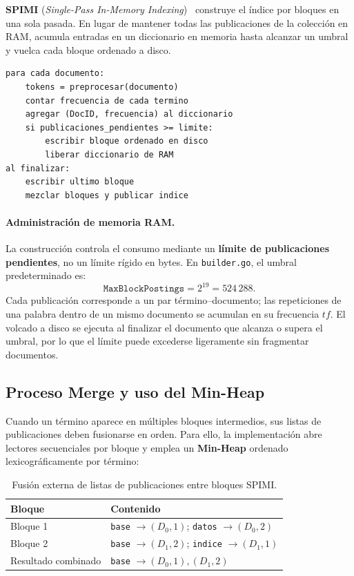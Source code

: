 \documentclass[11pt,a4paper]{article}
\begin{document}
\textbf{SPIMI} (\emph{Single-Pass In-Memory Indexing})~\cite{manning2008} construye el índice por bloques en una sola pasada. En lugar de mantener todas las publicaciones de la colección en RAM, acumula entradas en un diccionario en memoria hasta alcanzar un umbral y vuelca cada bloque ordenado a disco.

\begin{lstlisting}[style=pseudo,caption={Pseudocódigo simplificado de construcción con SPIMI}]
para cada documento:
    tokens = preprocesar(documento)
    contar frecuencia de cada termino
    agregar (DocID, frecuencia) al diccionario
    si publicaciones_pendientes >= limite:
        escribir bloque ordenado en disco
        liberar diccionario de RAM
al finalizar:
    escribir ultimo bloque
    mezclar bloques y publicar indice
\end{lstlisting}

\paragraph{Administración de memoria RAM.} La construcción controla el consumo mediante un \textbf{límite de publicaciones pendientes}, no un límite rígido en bytes. En \texttt{builder.go}, el umbral predeterminado es:
\[
\texttt{MaxBlockPostings} = 2^{19} = 524\,288.
\]
Cada publicación corresponde a un par término--documento; las repeticiones de una palabra dentro de un mismo documento se acumulan en su frecuencia $tf$. El volcado a disco se ejecuta al finalizar el documento que alcanza o supera el umbral, por lo que el límite puede excederse ligeramente sin fragmentar documentos.

\subsection{Proceso Merge y uso del Min-Heap}

Cuando un término aparece en múltiples bloques intermedios, sus listas de publicaciones deben fusionarse en orden. Para ello, la implementación abre lectores secuenciales por bloque y emplea un \textbf{Min-Heap} ordenado lexicográficamente por término:

\begin{table}[H]
  \centering
  \small
  \begin{tabular}{@{}ll@{}}
    \toprule
    \textbf{Bloque} & \textbf{Contenido} \\
    \midrule
    Bloque 1 & \texttt{base} $\to (D_0,1)$; \texttt{datos} $\to (D_0,2)$ \\
    Bloque 2 & \texttt{base} $\to (D_1,2)$; \texttt{indice} $\to (D_1,1)$ \\
    \midrule
    Resultado combinado & \texttt{base} $\to (D_0,1), (D_1,2)$ \\
    \bottomrule
  \end{tabular}
  \caption{Fusión externa de listas de publicaciones entre bloques SPIMI.}
\end{table}
\end{document}
